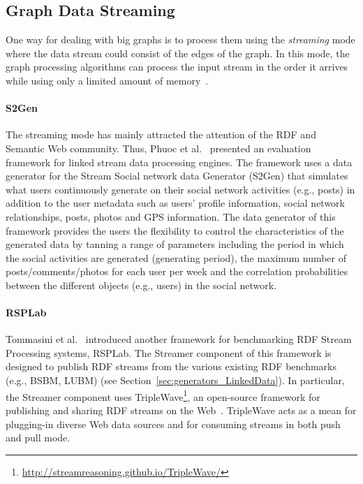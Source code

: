 \subsection{Graph Data Streaming}
\label{sec:generators_streaming}
One way for dealing with big graphs is to process them using the \emph{streaming} mode where the data stream could consist of the edges of the graph. In this mode, the graph processing algorithms can process the input stream in the order it arrives while using only a limited amount of memory~\cite{mcgregor2014graph}. 

\paragraph{S2Gen}  The streaming mode has mainly  attracted the attention of the RDF and Semantic Web community. Thus, Phuoc et al.~\cite{le2012linked} presented an evaluation framework for linked stream data processing engines. The framework uses a data generator for the Stream Social network data Generator (S2Gen) that simulates what users continuously generate on their social network activities (e.g., posts) in addition to the  user metadata such as users' profile information, social network relationships, posts, photos and GPS information. The data generator of this framework provides the users the flexibility to control the characteristics of the generated data by tanning a range of parameters including the period in which the social activities are generated (generating period), the maximum number of posts/comments/photos for each user per week and the correlation probabilities between the different objects (e.g., users) in the social network.

\paragraph{RSPLab} Tommasini et al.~\cite{tommasini2017rsplab} introduced another framework for benchmarking RDF Stream Processing systems, RSPLab. The Streamer component of this framework is designed to publish RDF streams from the various existing RDF benchmarks (e.g., BSBM, LUBM) (see Section~\ref{sec:generators_LinkedData}). In particular, the Streamer  component uses TripleWave\footnote{\url{http://streamreasoning.github.io/TripleWave/}}, an open-source framework for publishing and sharing RDF streams on the Web~\cite{mauri2016triplewave}.   TripleWave acts as a mean for plugging-in diverse Web data sources and for consuming streams in both push and pull mode.
